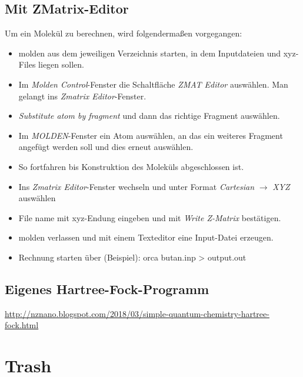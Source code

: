\documentclass[9pt]{report}
\begin{document}
\section{Mit ZMatrix-Editor}
Um ein Molekül zu berechnen, wird folgendermaßen vorgegangen:
\begin{itemize}
	\item molden aus dem jeweiligen Verzeichnis starten, in dem Inputdateien und xyz-Files liegen sollen.
	\item Im \textit{Molden Control}-Fenster die Schaltfläche \textit{ZMAT Editor} auswählen. Man gelangt ins \textit{Zmatrix Editor}-Fenster.
	\item \textit{Substitute atom by fragment} und dann das richtige Fragment auswählen.
	\item Im \textit{MOLDEN}-Fenster ein Atom auswählen, an das ein weiteres Fragment angefügt werden soll und dies erneut auswählen.
	\item So fortfahren bis Konstruktion des Moleküls abgeschlossen ist.
	\item Ins \textit{Zmatrix Editor}-Fenster wechseln und unter Format \textit{Cartesian} $\to$ \textit{XYZ} auswählen
	\item File name mit xyz-Endung eingeben und mit \textit{Write Z-Matrix} bestätigen.
	\item molden verlassen und mit einem Texteditor eine Input-Datei erzeugen.
	\item Rechnung starten über (Beispiel): orca butan.inp > output.out
\end{itemize}





\section{Eigenes Hartree-Fock-Programm}
\url{http://nznano.blogspot.com/2018/03/simple-quantum-chemistry-hartree-fock.html}

























\chapter{Trash}
\end{document}
